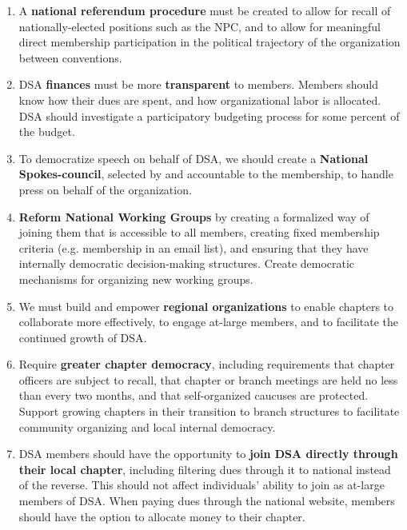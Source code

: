 \documentclass[10pt]{memoir}
\begin{document}
\begin{enumerate}
\item{
A \textbf{national referendum procedure} must be created to allow for recall of nationally-elected positions such as the NPC, and to allow for meaningful direct membership participation in the political trajectory of the organization between conventions.
}

\item{
DSA \textbf{finances} must be more \textbf{transparent} to members. Members should know how their dues are spent, and how organizational labor is allocated. DSA should investigate a participatory budgeting process for some percent of the budget.
}

\item{
To democratize speech on behalf of DSA, we should create a \linebreak\textbf{National Spokes-council}, selected by and accountable to the membership, to handle press on behalf of the organization.}
\item{\textbf{Reform National Working Groups} by creating a formalized way of joining them that is accessible to all members, creating fixed membership criteria (e.g. membership in an email list), and ensuring that they have internally democratic decision-making structures. Create democratic mechanisms for organizing new working groups.
}

\item{
We must build and empower \textbf{regional organizations} to enable chapters to collaborate more effectively, to engage at-large members, and to facilitate the continued growth of DSA.}
\item{Require \textbf{greater chapter democracy}, including requirements that chapter officers are subject to recall, that chapter or branch meetings are held no less than every two months, and that self-organized caucuses are protected. Support growing chapters in their transition to branch structures to facilitate community organizing and local internal democracy.
}

\item{
DSA members should have the opportunity to \textbf{join DSA directly through their local chapter}, including filtering dues through it to national instead of the reverse. This should not affect individuals' ability to join as at-large members of DSA. When paying dues through the national website, members should have the option to allocate money to their chapter.
}

\end{enumerate}
\end{document}
